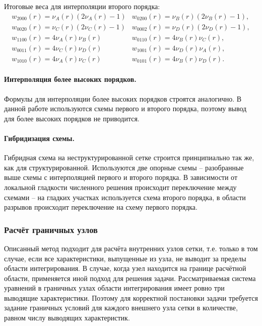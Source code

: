 Итоговые веса для интерполяции второго порядка:
\begin{eqnarray}
w_{2000}(r) = \nu_{A}(r) (2\nu_{A}(r)-1) & w_{0200}(r) = \nu_{B}(r) (2\nu_{B}(r)-1), \\
w_{0020}(r) = \nu_{C}(r) (2\nu_{C}(r)-1) & w_{0002}(r) = \nu_{D}(r) (2\nu_{D}(r)-1), \\
w_{1100}(r) =  4 \nu_{A}(r) \nu_{B}(r) & w_{0110}(r) =  4 \nu_{B}(r) \nu_{C}(r), \\
w_{0011}(r) =  4 \nu_{C}(r) \nu_{D}(r) & w_{1001}(r) =  4 \nu_{D}(r) \nu_{A}(r), \\
w_{1010}(r) =  4 \nu_{A}(r) \nu_{C}(r) & w_{0101}(r) =  4 \nu_{B}(r) \nu_{D}(r).
\end{eqnarray}


\paragraph{Интерполяция более высоких порядков.} Формулы для интерполяции более высоких порядков строятся аналогично. В данной работе используются схемы первого и второго порядка, поэтому вывод для более высоких порядков не приводится.

\paragraph{Гибридизация схемы.} Гибридная схема на неструктурированной сетке строится принципиально так же, как для структурированной. Используются две опорные схемы -- разобранные выше схемы с интерполяцией первого и второго порядка. В зависимости от локальной гладкости численного решения происходит переключение между схемами -- на гладких участках используется схема второго порядка, в области разрывов происходит переключение на схему первого порядка.


\subsubsection{Расчёт граничных узлов}


Описанный метод подходит для расчёта внутренних узлов
сетки, т.е. только в том случае, если все характеристики, выпущенные из узла, не
выводит за пределы области интегрирования. В случае, когда узел находится на границе расчётной области, 
применяется иной подход для решения задачи. Рассматриваемая система
уравнений в граничных узлах области интегрирования имеет ровно три
\cite{chelnokov} выводящие характеристики. Поэтому для корректной постановки
задачи требуется задание граничных условий для каждого внешнего узла сетки в
количестве, равном числу выводящих характеристик. 

